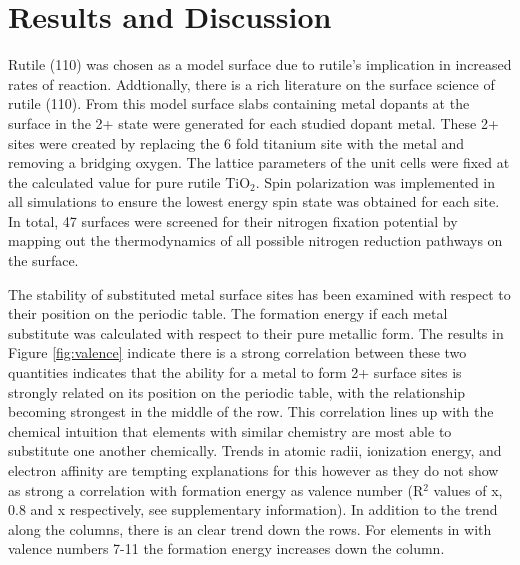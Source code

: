 \documentclass[catalysts,article,submit,moreauthors,pdftex,10pt,a4paper]{mdpi}
\theoremstyle{mdpi}
\newcounter{ex}
\newcounter{re}
\theoremstyle{mdpidefinition}
\begin{document}
\section{Results and Discussion}
Rutile (110) was chosen as a model surface due to rutile's implication in increased rates of reaction.\cite{Schrauzer_1977} Addtionally, there is a rich literature on the surface science of rutile (110)\cite{Diebold2003,Yates_1991,Lu1994,Walle2009}. From this model surface slabs containing metal dopants at the surface in the 2+ state were generated for each studied dopant metal. These 2+ sites were created by replacing the 6 fold titanium site with the metal and removing a bridging oxygen. The lattice parameters of the unit cells were fixed at the calculated value for pure rutile TiO$_2$. Spin polarization was implemented in all simulations to ensure the lowest energy spin state was obtained for each site. In total, 47  surfaces were screened for their nitrogen fixation potential by mapping out the thermodynamics of all possible nitrogen reduction pathways on the surface.



The stability of substituted metal surface sites has been examined with respect to their position on the periodic table. The formation energy if each metal substitute was calculated with respect to their pure metallic form. The results in Figure \ref{fig:valence} indicate there is a strong correlation between these two quantities indicates that the ability for a metal to form 2+ surface sites is strongly related on its position on the periodic table, with the relationship becoming strongest in the middle of the row. This correlation lines up with the chemical intuition that elements with similar chemistry are most able to substitute one another chemically. Trends in atomic radii, ionization energy, and electron affinity are tempting explanations for this however as they do not show as strong a correlation with formation energy as valence number (R$^2$ values of x, 0.8 and x respectively, see supplementary information). In addition to the trend along the columns, there is an clear trend down the rows. For elements in with valence numbers 7-11 the formation energy increases down the column.
\end{document}
